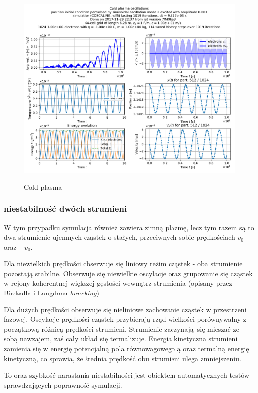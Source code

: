 \begin{figure}[h!]
  \includegraphics[width=\textwidth]{Images/COSCALING}
  \label{fig:coldplasma}
  \caption{Cold plasma}
\end{figure}

    \subsubsection{niestabilność dwóch strumieni}
W tym przypadku symulacja również zawiera zimną plazmę, lecz tym razem są to dwa strumienie ujemnych cząstek
o stałych, przeciwnych sobie prędkościach $v_0$ oraz $-v_0$.

    Dla niewielkich prędkości  obserwuje się
    liniowy reżim cząstek - oba strumienie pozostają stabilne. Obserwuje się niewielkie oscylacje oraz
grupowanie się cząstek w rejony koherentnej większej gęstości wewnątrz strumienia (opisany przez Birdsalla i Langdona \emph{bunching}).

    Dla dużych prędkości  obserwuje się nieliniowe
    zachowanie cząstek w przestrzeni fazowej. Oscylacje prędkości cząstek przybierają rząd wielkości porównywalny
    z początkową różnicą prędkości strumieni.
 Strumienie zaczynają się mieszać ze sobą nawzajem, zaś cały układ się termalizuje. Energia kinetyczna
 strumieni zamienia się w energię potencjalną pola równowagowego ą %
oraz termalną energię kinetyczną, co sprawia, że średnia prędkość obu strumieni ulega zmniejszeniu. %

To oraz szybkość narastania niestabilności jest obiektem automatycznych testów sprawdzających poprawność symulacji.


